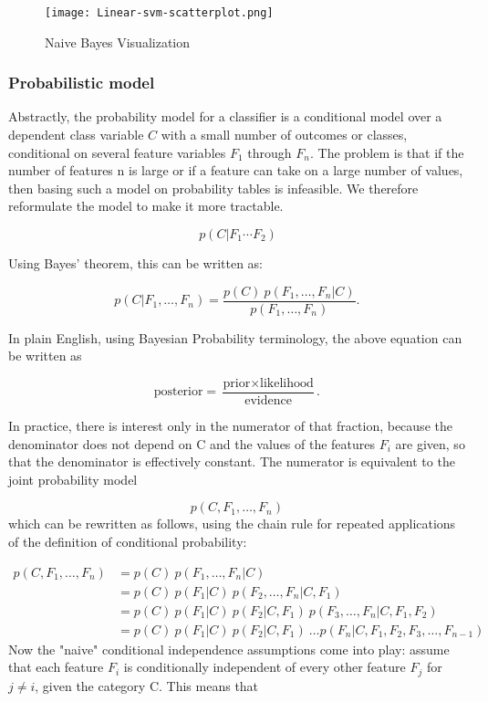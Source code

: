 \documentclass[12pt]{book}
\begin{document}
\begin{figure}[H]
\centering
\texttt{[image: Linear-svm-scatterplot.png]}
\caption{Naive Bayes Visualization\cite{wikipedia-naive}}
\label{fig:figure1}
\end{figure}

\subsubsection{Probabilistic model}
Abstractly, the probability model for a classifier is a conditional model over a dependent class variable $C$ with a small number of outcomes or classes, conditional on several feature variables $F_1$ through $F_n$. The problem is that if the number of features n is large or if a feature can take on a large number of values, then basing such a model on probability tables is infeasible. We therefore reformulate the model to make it more tractable.

$$ p(C|F_1\cdots F_2) $$

Using Bayes' theorem, this can be written as:

$$ p(C \vert F_1,\dots,F_n) = \frac{p(C) \ p(F_1,\dots,F_n\vert C)}{p(F_1,\dots,F_n)}. \,$$

In plain English, using Bayesian Probability terminology, the above equation can be written as

$$\mbox{posterior} = \frac{\mbox{prior} \times \mbox{likelihood}}{\mbox{evidence}}. \,$$

In practice, there is interest only in the numerator of that fraction, because the denominator does not depend on C and the values of the features $F_i$ are given, so that the denominator is effectively constant. The numerator is equivalent to the joint probability model

$$ p(C, F_1, \dots, F_n)\, $$
which can be rewritten as follows, using the chain rule for repeated applications of the definition of conditional probability:

\begin{align}
p(C, F_1, \dots, F_n) & = p(C) \ p(F_1,\dots,F_n\vert C) \\
                      & = p(C) \ p(F_1\vert C) \ p(F_2,\dots,F_n\vert C, F_1) \\
                      & = p(C) \ p(F_1\vert C) \ p(F_2\vert C, F_1) \ p(F_3,\dots,F_n\vert C, F_1, F_2) \\
                      & = p(C) \ p(F_1\vert C) \ p(F_2\vert C, F_1) \ \dots p(F_n\vert C, F_1, F_2, F_3,\dots,F_{n-1}) 
\end{align}
Now the "naive" conditional independence assumptions come into play: assume that each feature $F_i$ is conditionally independent of every other feature $F_j$ for $j\neq i$, given the category C. This means that
\end{document}

